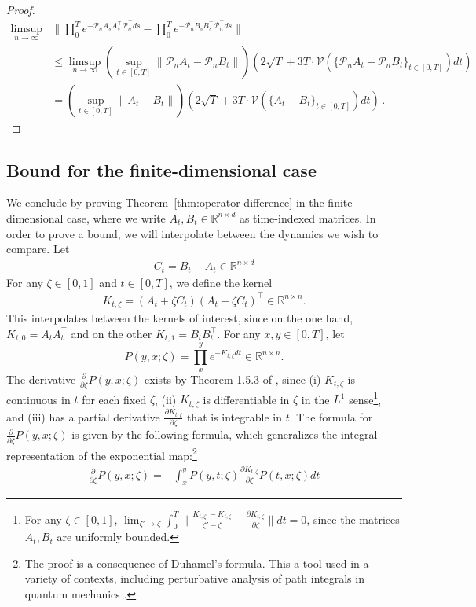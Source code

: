 \documentclass[11pt]{article} %
\newcommand{\R}{\mathbb{R}}
\newcommand{\<}{\langle}
\renewcommand{\>}{\rangle}
\def\cV{{\mathcal V}}
\def\cP{{\mathcal P}}
\def\cV{{\mathcal V}}
\def\cP{{\mathcal P}}
\def\cV{{\mathcal V}}
\newcommand{\pd}[2]{\frac{\partial #1}{\partial #2}}
\theoremstyle{plain}
\theoremstyle{definition}
\theoremstyle{remark}
\begin{document}
\begin{proof}
\begin{align*}
\limsup_{n \to\infty}&\|\prod_{0}^T e^{-\cP_n A_s A_s^{\top} \cP_n^{\top} ds} - \prod_{0}^T e^{-\cP_n B_s B_s^{\top}\cP_n^{\top} ds}\| \\
&\leq \limsup_{n \to\infty} (\sup_{t \in [0,T]} \|\cP_n A_t - \cP_n B_t\|) (2\sqrt{T} + 3 T \cdot \cV(\{\cP_n A_{t} - \cP_nB_{t}\}_{t \in [0,T]}) dt) \\
&= (\sup_{t \in [0,T]} \|A_t - B_t\|) (2\sqrt{T} + 3 T \cdot \cV(\{A_{t} - B_{t}\}_{t \in [0,T]}) dt)\,.
\end{align*}
\end{proof}


\subsection{Bound for the finite-dimensional case}

We conclude by proving Theorem~\ref{thm:operator-difference} in the finite-dimensional case, where we write $A_t, B_t \in \R^{n \times d}$ as time-indexed matrices. In order to prove a bound, we will interpolate between the dynamics we wish to compare. Let
\begin{align*}
C_t = B_t - A_t \in \R^{n \times d}
\end{align*}
For any $\zeta \in [0,1]$ and $t \in [0,T]$, we define the kernel
\begin{align*}
K_{t,\zeta} = (A_t + \zeta C_t)(A_t + \zeta C_t)^{\top} \in \R^{n \times n}.
\end{align*}
This interpolates between the kernels of interest, since on the one hand, $K_{t,0} = A_t A_t^{\top}$ and on the other $K_{t,1} = B_t B_t^{\top}$. For any $x,y \in [0,T]$, let
$$P(y,x; \zeta) = \prod_{x}^y e^{-K_{t,\zeta} dt} \in \R^{n \times n}.$$
The derivative $\pd{}{\zeta} P(y,x;\zeta)$ exists by Theorem 1.5.3 of \cite{dollard_friedman_1984}, since (i) $K_{t,\zeta}$ is continuous in $t$ for each fixed $\zeta$, (ii) $K_{t,\zeta}$ is differentiable in $\zeta$ in the $L^1$ sense\footnote{For any $\zeta \in [0,1]$, $\lim_{\zeta' \to \zeta} \int_{0}^T \|\frac{K_{t,\zeta'} - K_{t,\zeta}}{\zeta' - \zeta} - \pd{K_{t,\zeta}}{\zeta}\| dt = 0$, since the matrices $A_t,B_t$ are uniformly bounded.}, and (iii) has a partial derivative $\pd{K_{t,\zeta}}{\zeta}$ that is integrable in $t$. The formula for $\pd{}{\zeta} P(y,x;\zeta)$ is given by the following formula, which generalizes the integral representation of the exponential map:\footnote{The proof is a consequence of Duhamel's formula. This a tool used in a variety of contexts, including perturbative analysis of path integrals in quantum mechanics \cite{dollard_friedman_1984}.}
\begin{align}\label{eq:derivative-wrt-parameter}
\pd{}{\zeta} P(y,x; \zeta) = -\int_{x}^y P(y,t; \zeta) \pd{K_{t,\zeta}}{\zeta} P(t,x; \zeta) dt
\end{align}
\end{document}
